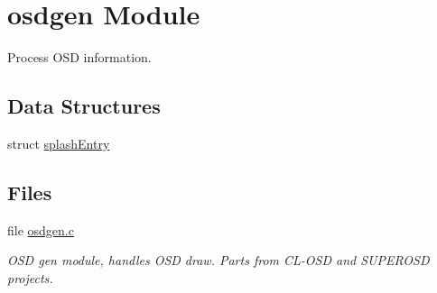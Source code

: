 \hypertarget{group___o_s_d_g_e_n_module}{\section{osdgen \-Module}
\label{group___o_s_d_g_e_n_module}
}


\-Process \-O\-S\-D information.  


\subsection*{\-Data \-Structures}
\begin{DoxyCompactItemize}
\item 
struct \hyperlink{structsplash_entry}{splash\-Entry}
\end{DoxyCompactItemize}
\subsection*{\-Files}
\begin{DoxyCompactItemize}
\item 
file \hyperlink{osdgen_8c}{osdgen.\-c}
\begin{DoxyCompactList}\small\item\em \-O\-S\-D gen module, handles \-O\-S\-D draw. \-Parts from \-C\-L-\/\-O\-S\-D and \-S\-U\-P\-E\-R\-O\-S\-D projects. \end{DoxyCompactList}\end{DoxyCompactItemize}
